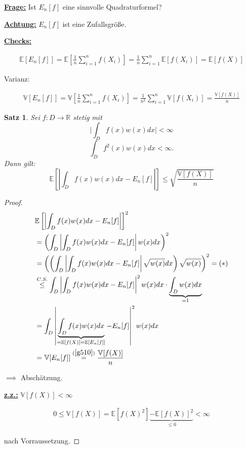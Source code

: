 \documentclass{book}
\newtheorem{theorem}[algorithm]{Satz}
\def\R{\mathbb{R}}
\def\E{\mathbb{E}}
\def\V{\mathbb{V}}
\begin{document}
            \underline{\textbf{Frage:}} Ist $E_n[f]$ eine sinnvolle Quadraturformel?

            \underline{\textbf{Achtung:}} $E_n[f]$ ist eine Zufallsgröße.

            \underline{\textbf{Checks:}} 

            \begin{align*}
                \mathbb{E}[E_n[f]]=\mathbb{E}[\frac{1}{n}\sum_{i=1}^n f(X_i)]=\frac{1}{n}\sum_{i=1}^n\mathbb{E}[f(X_i)]=\E[f(X)]
            \end{align*}

            Varianz:

            \begin{align}\label{g510}
                \V[E_n[f]]=\V[\frac{1}{n}\sum_{i=1}^nf(X_i)]=\frac{1}{n^2}\sum_{i=1}^n \V[f(X_i)]=\frac{\V[f(X)]}{n}
            \end{align}

            
            \begin{theorem}\label{s522}
                Sei $f:D\to\R$ stetig mit 
                \[\vert \int_D f(x)w(x)dx\vert < \infty\]
                \[\int_D f^2(x)w(x)dx < \infty.\]
                Dann gilt: 
                \[\E\left[\left\vert \int_D f(x)w(x)dx-E_n[f] \right\vert\right]\leq \sqrt{\frac{\V[f(X)]}{n}}\]
            \end{theorem}

            \begin{proof}

                \begin{align*}
                    &\E\left[\left\vert \int_D f(x)w(x)dx-E_n[f] \right\vert\right]^2\\
                    &=\left(\int_D \left\vert \int_D f(x)w(x)dx-E_n[f] \right\vert w(x) dx\right)^2\\
                    &=\left(\left(\int_D \left\vert \int_D f(x)w(x)dx-E_n[f] \right\vert \sqrt{w(x)} dx\right)\sqrt{w(x)}\right)^2 = (*)\\
                    &\stackrel{C.S.}{\leq} \int_D\left\vert \int_D f(x)w(x)dx-E_n[f] \right\vert^2w(x)dx \cdot \underbrace{\int_D w(x)dx}_{=1}\\
                    &=\int_D \left\vert \underbrace{\int_D f(x) w(x)dx}_{=\E[f(X)]=\E[E_n[f]]}-E_n[f] \right\vert^2 w(x)dx\\
                    &=\V[E_n[f]]\stackrel{(\ref{g510})}{=} \frac{\V[f(X)]}{n}
                \end{align*}

                $\implies$ Abschätzung.

                \underline{\textbf{z.z.:}} $\V[f(X)]<\infty$

                \begin{align*}
                    0\leq \V[f(X)] = \E[f(X)^2]\underbrace{-\E[f(X)]^2}_{\leq 0} <\infty
                \end{align*}

                nach Vorraussetzung.

            \end{proof}
\end{document}
